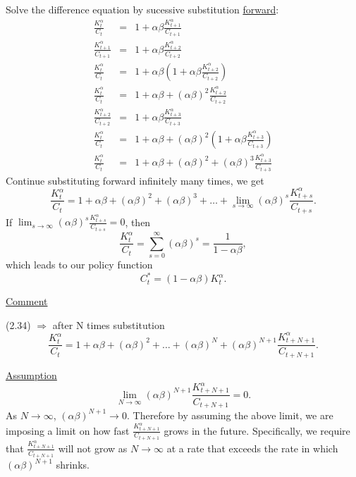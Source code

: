 \documentclass[twoside]{article}
\begin{document}
Solve the difference equation by sucessive substitution \underline{forward}:
\begin{eqnarray}
    \frac{K_t^\alpha}{C_t} &=& 1+ \alpha \beta \frac{K_{t+1}^\alpha}{C_{t+1}}\\
    \frac{K_{t+1}^\alpha}{C_{t+1}} &=& 1+ \alpha \beta \frac{K_{t+2}^\alpha}{C_{t+2}}\\
    \frac{K_t^\alpha}{C_t} &=& 1+ \alpha \beta (1+ \alpha \beta \frac{K_{t+2}^\alpha}{C_{t+2}})\\
    \frac{K_t^\alpha}{C_t} &=& 1+ \alpha \beta  + (\alpha \beta)^2 \frac{K_{t+2}^\alpha}{C_{t+2}}\\
    \frac{K_{t+2}^\alpha}{C_{t+2}} &=& 1+ \alpha \beta \frac{K_{t+3}^\alpha}{C_{t+3}}\\
    \frac{K_t^\alpha}{C_t} &=& 1+ \alpha \beta  + (\alpha \beta)^2 (1+ \alpha \beta \frac{K_{t+3}^\alpha}{C_{t+3}})\\
    \frac{K_t^\alpha}{C_t} &=& 1+ \alpha \beta  + (\alpha \beta)^2 + (\alpha \beta)^3 \frac{K_{t+3}^\alpha}{C_{t+3}}    
\end{eqnarray}
Continue substituting forward infinitely many times, we get
\begin{equation}
    \frac{K_t^\alpha}{C_t} = 1+ \alpha \beta  + (\alpha \beta)^2 + (\alpha \beta)^3 + \dots + \lim_{s \to \infty} (\alpha \beta)^{s}\frac{K_{t+s}^\alpha}{C_{t+s}}.
\end{equation}
If $\lim_{s \to \infty} (\alpha \beta)^{s}\frac{K_{t+s}^\alpha}{C_{t+s}} = 0$, then
\begin{equation}
    \frac{K_t^\alpha}{C_t} = \sum_{s=0}^{\infty} (\alpha \beta)^s = \frac{1}{1- \alpha \beta},
\end{equation}
which leads to our policy function
\begin{equation}
    C_t^* = (1- \alpha \beta )K_t^\alpha.
\end{equation}


\underline{Comment}

(2.34) $\Longrightarrow$ after N times substitution
\begin{equation}
    \frac{K_t^\alpha}{C_t} = 1+ \alpha \beta  + (\alpha \beta)^2 + \dots + (\alpha \beta)^N + (\alpha \beta)^{N+1}\frac{K_{t+N+1}^\alpha}{C_{t+N+1}}.
\end{equation}

\underline{Assumption}
\begin{equation}
    \lim_{N \to \infty} (\alpha \beta)^{N+1}\frac{K_{t+N+1}^\alpha}{C_{t+N+1}} = 0.
\end{equation}
As $N \to \infty$, $(\alpha \beta)^{N+1} \to 0$. Therefore by assuming the above limit, we are imposing a limit on how fast $\frac{K_{t+N+1}^\alpha}{C_{t+N+1}}$ grows in the future. Specifically, we require that $\frac{K_{t+N+1}^\alpha}{C_{t+N+1}}$ will not grow as $N \to \infty$ at a rate that exceeds the rate in which $(\alpha \beta)^{N+1} $ shrinks.
\end{document}
